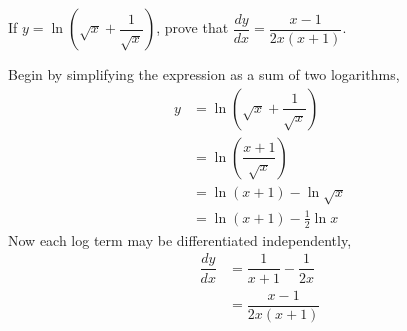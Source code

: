 

\question If $y=\ln \left(\sqrt{x}+\dfrac{1}{\sqrt{x}}\right)$, 
prove that $\dfrac{dy}{dx}=\dfrac{x-1}{2x(x+1)}$.

\begin{solution}
  Begin by simplifying the expression as a sum of two logarithms,
  \begin{align}
    y&=\ln \left(\sqrt{x}+\dfrac{1}{\sqrt{x}}\right) \\
     &=\ln \left(\dfrac{x+1}{\sqrt{x}}\right) \\
     &=\ln (x+1) -\ln \sqrt{x} \\
     &=\ln (x+1) -\frac{1}{2}\ln x
  \end{align}
  Now each log term may be differentiated independently,
  \begin{align}
    \dfrac{dy}{dx}&=\dfrac{1}{x+1}-\dfrac{1}{2x} \\
                  &=\dfrac{x-1}{2x(x+1)}
  \end{align}
\end{solution}
